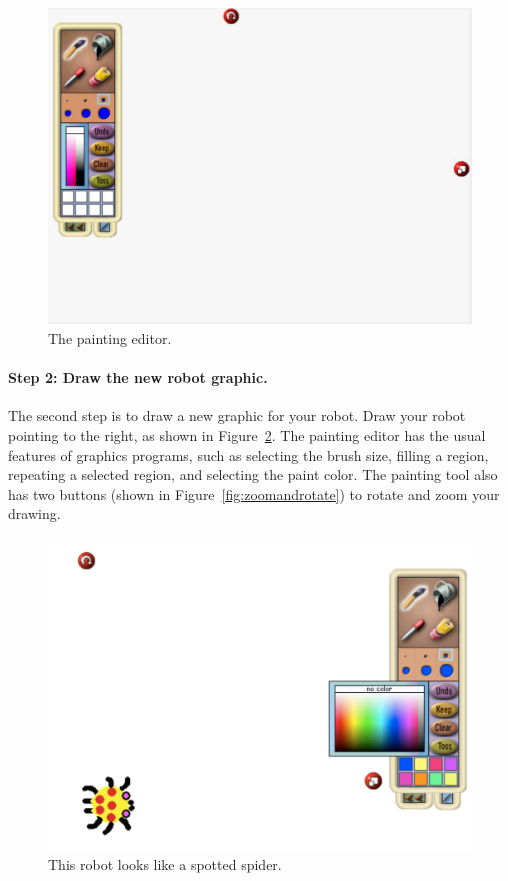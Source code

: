 \documentclass[a4paper,10pt,twoside]{book}
\begin{document}
\begin{figure}[h]
\begin{center}
\includegraphics[width=\textwidth]{paintOpen}
\caption{The painting editor. \label{fig:paintOpen}}
\end{center}
\end{figure}

\paragraph{Step 2: Draw the new robot graphic.}

The second step is to draw a new graphic for your robot. Draw your robot pointing to the right, as shown in Figure~\ref{fig:spottedspider}. The painting editor has the usual features of graphics programs, such as selecting the brush size, filling a 
region, repeating a selected region, and selecting the paint color. The painting tool also 
has two buttons (shown in Figure~\ref{fig:zoomandrotate}) to rotate and zoom your drawing. 


\begin{figure}[h]
\begin{center}
\includegraphics[width=\textwidth]{editingSpider}
\end{center}
\caption{This robot looks like a spotted spider.\label{fig:spottedspider}}
\end{figure}
\end{document}
